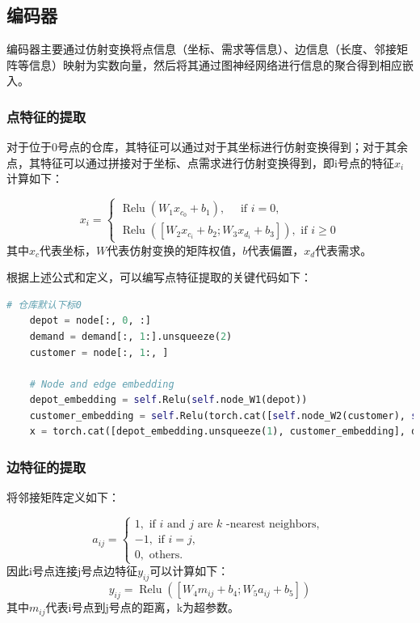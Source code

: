 \documentclass[withoutpreface,bwprint]{cumcmthesis} %
\begin{document}
\subsection{编码器}

	编码器主要通过仿射变换将点信息（坐标、需求等信息）、边信息（长度、邻接矩阵等信息）映射为实数向量，然后将其通过图神经网络进行信息的聚合得到相应嵌入。

\subsubsection{点特征的提取}
	对于位于0号点的仓库，其特征可以通过对于其坐标进行仿射变换得到；对于其余点，其特征可以通过拼接对于坐标、点需求进行仿射变换得到，即i号点的特征$x_i$计算如下：
	
	$$
	x_{i}=\left\{\begin{array}{l}
	\operatorname{Relu}\left(W_{1} x_{c_{0}}+b_{1}\right), \quad \text { if } i=0, \\
	\operatorname{Relu}\left(\left[W_{2} x_{c_{i}}+b_{2} ; W_{3} x_{d_{i}}+b_{3}\right]\right), \text { if } i \geq 0
	\end{array}\right.
	$$
	其中$x_c$代表坐标，$W$代表仿射变换的矩阵权值，$b$代表偏置，$x_d$代表需求。
	
	根据上述公式和定义，可以编写点特征提取的关键代码如下：
	\begin{lstlisting}[language=python]
	# 仓库默认下标0
	depot = node[:, 0, :]
	demand = demand[:, 1:].unsqueeze(2)
	customer = node[:, 1:, ]
	
	# Node and edge embedding
	depot_embedding = self.Relu(self.node_W1(depot))
	customer_embedding = self.Relu(torch.cat([self.node_W2(customer), self.node_W3(demand)], dim=2))
	x = torch.cat([depot_embedding.unsqueeze(1), customer_embedding], dim=1)
	\end{lstlisting}
	
	
\subsubsection{边特征的提取}
	将邻接矩阵定义如下：
	
	$$
	a_{i j}=\left\{\begin{array}{l}
	1, \text { if } i \text { and } j \text { are } k\text { -nearest neighbors, } \\
	-1, \text { if } i=j \text{,}\\
	0, \text { others. }
	\end{array}\right.
	$$
	因此i号点连接j号点边特征$y_{i j}$可以计算如下：
	$$
	y_{i j}=\operatorname{Relu}\left(\left[W_{4} m_{i j}+b_{4} ; W_{5} a_{i j}+b_{5}\right]\right)
	$$
	其中$m_{i j}$代表i号点到j号点的距离，k为超参数。
\end{document}
